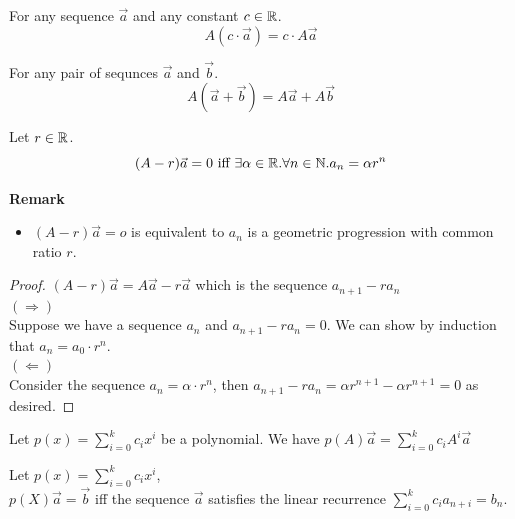 \begin{lemma}
    For any sequence $\vec{a}$ and any constant $c \in \mathbb{R}$. $$A(c \cdot \vec{a})=c \cdot A\vec{a}$$
\end{lemma}

\begin{lemma}
    For any pair of sequnces $\vec{a}$ and $\vec{b}$. $$A(\vec{a}+\vec{b})=A\vec{a}+A\vec{b}$$
\end{lemma}

\begin{theorem}
    Let $r \in \mathbb{R}$.
    $$(A-r)\vec{a}=0 \text{ iff } \exists \alpha \in \mathbb{R}. \forall n \in \mathbb{N}. a_n=\alpha r^n$$
\end{theorem}
\textbf{Remark}
\begin{itemize}
    \item $(A-r)\vec{a}=o$ is equivalent to $a_n$ is a geometric progression with common ratio $r$.
\end{itemize}
\begin{proof}
    $(A-r)\vec{a}=A\vec{a}-r\vec{a}$ which is the sequence $a_{n+1}-ra_n$\\
    $(\Rightarrow)$\\
    Suppose we have a sequence $a_n$ and $a_{n+1}-ra_n=0$. 
    We can show by induction that $a_n=a_0 \cdot r^n$.\\
    $(\Leftarrow)$\\
    Consider the sequence $a_n=\alpha \cdot r^n$, then $a_{n+1}-ra_n=\alpha r^{n+1}- \alpha r^{n+1}=0$ as desired.
\end{proof}

\begin{definition}
    Let $p(x)=\sum_{i=0}^{k}c_ix^i$ be a polynomial. We have $p(A)\vec{a}=\sum_{i=0}^{k}c_iA^i\vec{a}$
\end{definition}

\begin{lemma}
    Let $p(x)=\sum_{i=0}^{k}c_ix^i$,\\
    $p(X)\vec{a}=\vec{b}$ iff the sequence $\vec{a}$ satisfies the linear recurrence $\sum_{i=0}^kc_ia_{n+i}=b_n$.
\end{lemma}

